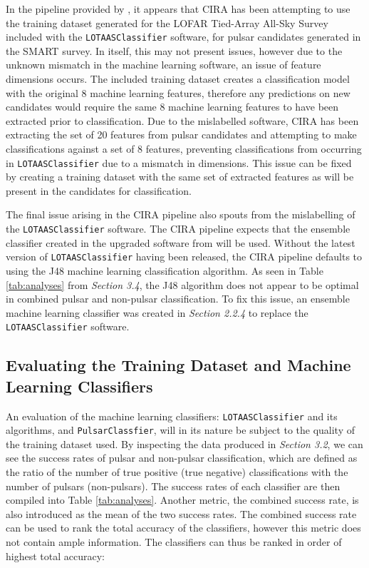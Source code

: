 \documentclass{article}
\begin{document}
In the pipeline provided by \textcite{swainston}, it appears that CIRA has been attempting to use the training dataset generated for the LOFAR Tied-Array All-Sky Survey included with the \verb|LOTAASClassifier| software, for pulsar candidates generated in the SMART survey. In itself, this may not present issues, however due to the unknown mismatch in the machine learning software, an issue of feature dimensions occurs. The included training dataset creates a classification model with the original 8 machine learning features, therefore any predictions on new candidates would require the same 8 machine learning features to have been extracted prior to classification. Due to the mislabelled software, CIRA has been extracting the set of 20 features from pulsar candidates and attempting to make classifications against a set of 8 features, preventing classifications from occurring in \verb|LOTAASClassifier| due to a mismatch in dimensions. This issue can be fixed by creating a training dataset with the same set of extracted features as will be present in the candidates for classification.

The final issue arising in the CIRA pipeline also spouts from the mislabelling of the \verb|LOTAASClassifier| software. The CIRA pipeline expects that the ensemble classifier created in the upgraded software from \textcite{tan} will be used. Without the latest version of \verb|LOTAASClassifier| having been released, the CIRA pipeline defaults to using the J48 machine learning classification algorithm. As seen in Table \ref{tab:analyses} from \emph{Section 3.4}, the J48 algorithm does not appear to be optimal in combined pulsar and non-pulsar classification. To fix this issue, an ensemble machine learning classifier was created in \emph{Section 2.2.4} to replace the \verb|LOTAASClassifier| software.

\subsection{Evaluating the Training Dataset and Machine Learning Classifiers}

An evaluation of the machine learning classifiers: \verb|LOTAASClassifier| and its algorithms, and \verb|PulsarClassfier|, will in its nature be subject to the quality of the training dataset used. By inspecting the data produced in \emph{Section 3.2}, we can see the success rates of pulsar and non-pulsar classification, which are defined as the ratio of the number of true positive (true negative) classifications with the number of pulsars (non-pulsars). The success rates of each classifier are then compiled into Table \ref{tab:analyses}. Another metric, the combined success rate, is also introduced as the mean of the two success rates. The combined success rate can be used to rank the total accuracy of the classifiers, however this metric does not contain ample information. The classifiers can thus be ranked in order of highest total accuracy:
\end{document}

